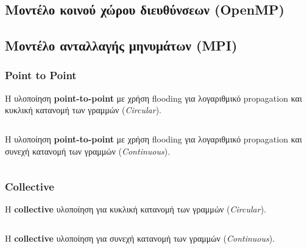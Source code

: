 \documentclass[a4paper,10pt]{article} \usepackage{anysize}
\begin{document}

\subsection{Μοντέλο κοινού χώρου διευθύνσεων (\textbf{OpenMP})}


\pagebreak

\subsection{Μοντέλο ανταλλαγής μηνυμάτων (\textbf{MPI})}

\subsubsection{Point to Point}

Η υλοποίηση \textbf{point-to-point} με χρήση flooding για λογαριθμικό
propagation και κυκλική κατανομή των γραμμών (\textit{Circular}).

\inputminted[linenos,fontsize=\scriptsize,frame=leftline]{c}{files/src-mpi-ptp-hybrid-main.c}

Η υλοποίηση \textbf{point-to-point} με χρήση flooding για λογαριθμικό
propagation και συνεχή κατανομή των γραμμών (\textit{Continuous}).

\inputminted[linenos,fontsize=\scriptsize,frame=leftline]{c}{files/src-mpi-ptp-continuous-single-main.c}

\subsubsection{Collective}
Η \textbf{collective} υλοποίηση για κυκλική κατανομή των γραμμών
(\textit{Circular}).

\inputminted[linenos,fontsize=\scriptsize,frame=leftline]{c}{files/src-mpi-collective-hybrid-main.c}

Η \textbf{collective} υλοποίηση για συνεχή κατανομή των γραμμών
(\textit{Continuous}).

\inputminted[linenos,fontsize=\scriptsize,frame=leftline]{c}{files/src-mpi-collective-continuous-single-main.c}

\end{document}
